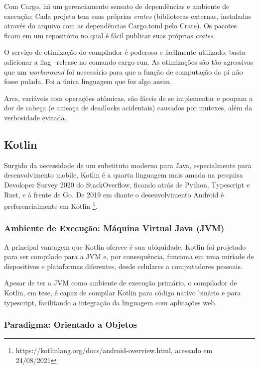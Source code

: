 \documentclass{article}
\begin{document}
Com Cargo, há um gerenciamento sensato de dependências e ambiente de execução: Cada projeto tem suas próprias \emph{crates} (bibliotecas externas, instaladas através do arquivo com as dependências Cargo.toml pelo Crate). Os pacotes ficam em um repositório no qual é fácil publicar suas próprias \emph{crates}.

O serviço de otimização do compilador é poderoso e facilmente utilizado: basta adicionar a flag --release no comando cargo run. As otimizações são tão agressivas que um \emph{workaround} foi necessário para que a função de computação do pi não fosse pulada. Foi a única linguagem que fez algo assim.

Arcs, variáveis com operações atômicas, são fáceis de se implementar e poupam a dor de cabeça (e ameaça de deadlocks acidentais) causados por mutexes, além da verbosidade evitada.

\subsection{Kotlin}
\label{ssec:kotlin}

Surgido da necessidade de um substituto moderno para Java, especialmente para desenvolvimento mobile, Kotlin é a quarta linguagem mais amada na pesquisa Devoloper Survey 2020 do StackOverflow, ficando atrás de Python, Typescript e Rust, e à frente de Go. De 2019 em diante o desenvolvimento Android é preferencialmente em Kotlin \footnote{https://kotlinlang.org/docs/android-overview.html, acessado em 24/08/2021}.

\subsubsection{Ambiente de Execução: Máquina Virtual Java (JVM)}
\label{sssec:kotlin ambiente execucao}

A principal vantagem que Kotlin oferece é sua ubiquidade. Kotlin foi projetado para ser compilado para a JVM e, por consequência, funciona em uma miríade de dispositivos e plataformas diferentes, desde celulares a computadores pessoais.

Apesar de ter a JVM como ambiente de execução primário, o compilador de Kotlin, em tese, é capaz de compilar Kotlin para código nativo binário e para typescript, facilitando a integração da linguagem com aplicações web.

\subsubsection{Paradigma: Orientado a Objetos}
\label{sssec:kotlin paradigma}
\end{document}
